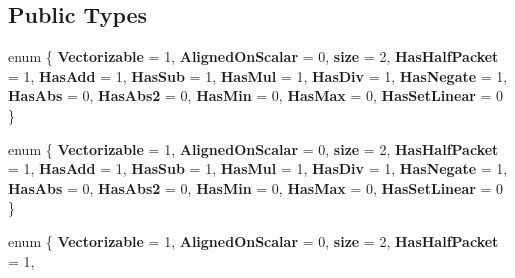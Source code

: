 \subsection*{Public Types}
\begin{DoxyCompactItemize}
\item 
\mbox{\label{struct_eigen_1_1internal_1_1packet__traits_3_01std_1_1complex_3_01double_01_4_01_4_a1c3924248ecbf646baa1b5776d915d3b}} 
enum \{ \newline
{\bfseries Vectorizable} = 1, 
{\bfseries Aligned\+On\+Scalar} = 0, 
{\bfseries size} = 2, 
{\bfseries Has\+Half\+Packet} = 1, 
\newline
{\bfseries Has\+Add} = 1, 
{\bfseries Has\+Sub} = 1, 
{\bfseries Has\+Mul} = 1, 
{\bfseries Has\+Div} = 1, 
\newline
{\bfseries Has\+Negate} = 1, 
{\bfseries Has\+Abs} = 0, 
{\bfseries Has\+Abs2} = 0, 
{\bfseries Has\+Min} = 0, 
\newline
{\bfseries Has\+Max} = 0, 
{\bfseries Has\+Set\+Linear} = 0
 \}
\item 
\mbox{\label{struct_eigen_1_1internal_1_1packet__traits_3_01std_1_1complex_3_01double_01_4_01_4_ae3b942c7951fb1c9dde280612698b8c0}} 
enum \{ \newline
{\bfseries Vectorizable} = 1, 
{\bfseries Aligned\+On\+Scalar} = 0, 
{\bfseries size} = 2, 
{\bfseries Has\+Half\+Packet} = 1, 
\newline
{\bfseries Has\+Add} = 1, 
{\bfseries Has\+Sub} = 1, 
{\bfseries Has\+Mul} = 1, 
{\bfseries Has\+Div} = 1, 
\newline
{\bfseries Has\+Negate} = 1, 
{\bfseries Has\+Abs} = 0, 
{\bfseries Has\+Abs2} = 0, 
{\bfseries Has\+Min} = 0, 
\newline
{\bfseries Has\+Max} = 0, 
{\bfseries Has\+Set\+Linear} = 0
 \}
\item 
\mbox{\label{struct_eigen_1_1internal_1_1packet__traits_3_01std_1_1complex_3_01double_01_4_01_4_a0ba4d6642c26ca1d5d8fcd3deb4a3fc6}} 
enum \{ \newline
{\bfseries Vectorizable} = 1, 
{\bfseries Aligned\+On\+Scalar} = 0, 
{\bfseries size} = 2, 
{\bfseries Has\+Half\+Packet} = 1, 

\end{DoxyCompactItemize}
